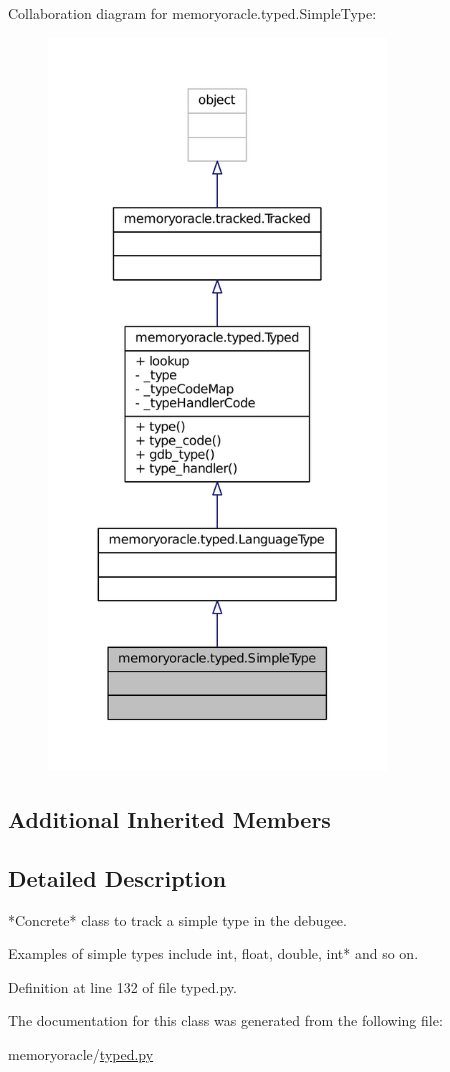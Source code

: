 Collaboration diagram for memoryoracle.\+typed.\+Simple\+Type\+:\nopagebreak
\begin{figure}[H]
\begin{center}
\leavevmode
\includegraphics[height=550pt]{classmemoryoracle_1_1typed_1_1SimpleType__coll__graph}
\end{center}
\end{figure}
\subsection*{Additional Inherited Members}


\subsection{Detailed Description}
\begin{DoxyVerb}*Concrete* class to track a simple type in the debugee.

Examples of simple types include int, float, double, int* and so on.
\end{DoxyVerb}
 

Definition at line 132 of file typed.\+py.



The documentation for this class was generated from the following file\+:\begin{DoxyCompactItemize}
\item 
memoryoracle/\hyperlink{typed_8py}{typed.\+py}\end{DoxyCompactItemize}
